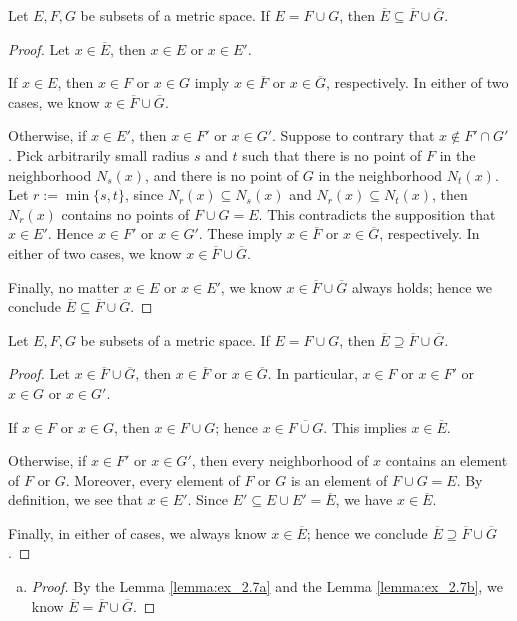 \begin{Exercise}
\begin{lemma}\label{lemma:ex_2.7a}
Let $E,F,G$ be subsets of a metric space. If $E=F\cup G$, then $\overline{E} \subseteq \overline{F}\cup\overline{G}$.
\end{lemma}
\begin{proof}
Let $x\in\overline{E}$, then $x\in E$ or $x\in E'$.

If $x\in E$, then $x\in F$ or $x\in G$ imply $x\in\overline{F}$ or $x\in\overline{G}$, respectively.
In either of two cases, we know $x\in \overline{F}\cup\overline{G}$.

Otherwise, if $x\in E'$, then $x\in F'$ or $x\in G'$. Suppose to contrary that $x\notin F'\cap G'$. Pick arbitrarily small radius $s$ and $t$ such that there is no point of $F$ in the neighborhood $N_s(x)$, and there is no point of $G$ in the neighborhood $N_t(x)$. Let $r := \min\{s,t\}$, since $N_r(x)\subseteq N_s(x)$ and $N_r(x)\subseteq N_t(x)$, then $N_r(x)$ contains no points of $F\cup G = E$. This contradicts the supposition that $x\in E'$. Hence $x\in F'$ or $x\in G'$. These imply $x\in \overline{F}$ or $x\in \overline{G}$, respectively. In either of two cases, we know $x\in \overline{F}\cup \overline{G}$.

Finally, no matter $x\in E$ or $x\in E'$, we know $x\in \overline{F}\cup \overline{G}$ always holds; hence we conclude $\overline{E} \subseteq \overline{F}\cup \overline{G}$.
\end{proof}

\begin{lemma}\label{lemma:ex_2.7b}
Let $E,F,G$ be subsets of a metric space. If $E=F\cup G$, then $\overline{E} \supseteq \overline{F}\cup\overline{G}$.
\end{lemma}
\begin{proof}
Let $x\in \overline{F}\cup \overline{G}$, then $x\in \overline{F}$ or $x\in \overline{G}$. In particular, $x\in F$ or $x\in F'$ or $x\in G$ or $x\in G'$.

If $x\in F$ or $x\in G$, then $x\in F\cup G$; hence $x\in \overline{F\cup G}$. This implies $x\in \overline{E}$.

Otherwise, if $x\in F'$ or $x\in G'$, then every neighborhood of $x$ contains an element of $F$ or $G$. Moreover, every element of $F$ or $G$ is an element of $F\cup G = E$. By definition, we see that $x\in E'$. Since $E' \subseteq E\cup E' = \overline{E}$, we have $x\in \overline{E}$.

Finally, in either of cases, we always know $x\in \overline{E}$; hence we conclude $\overline{E} \supseteq \overline{F}\cup\overline{G}$.
\end{proof}
\begin{enumerate}[a)]
\item
\begin{proof}
By the Lemma \ref{lemma:ex_2.7a} and the Lemma  \ref{lemma:ex_2.7b}, we know $\overline{E} = \overline{F}\cup\overline{G}$.


\end{proof}
\end{enumerate}
\end{Exercise}
